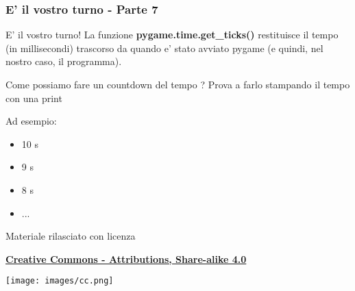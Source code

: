 \documentclass{beamer}
\begin{document}
\begin{frame}[fragile]
\frametitle{E' il vostro turno - Parte 7}
\begin{block}{E' il vostro turno!}
La funzione \textbf{ pygame.time.get\_ticks() } restituisce il tempo (in millisecondi) trascorso da quando e' stato avviato pygame (e quindi, nel nostro caso, il programma).

\vspace{5mm}
Come possiamo fare un countdown del tempo       ?
Prova a farlo stampando il tempo con una print

Ad esempio:
\begin{itemize}
    \item 10 s
    \item 9 s
    \item 8 s 
    \item ...
\end{itemize}
\end{block}

\end{frame}

\begin{frame}

\begin{center}
    \bigskip
    Materiale rilasciato con licenza
    
    \textbf{\href{http://creativecommons.org/licenses/by-sa/4.0/}{Creative Commons - Attributions, Share-alike 4.0}}
    
    \medskip
    \texttt{[image: images/cc.png]}
\end{center}

\end{frame}
\end{document}
